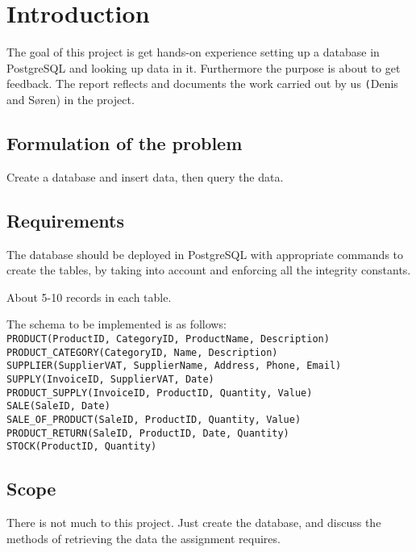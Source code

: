 \section{Introduction}
The goal of this project is get hands-on experience setting up a database in PostgreSQL and
looking up data in it. Furthermore the purpose is about to get feedback. The report
reflects and documents the work carried out by us \texttt(Denis and Søren) in the project.

\subsection{Formulation of the problem}
Create a database and insert data, then query the data.

\subsection{Requirements}
The database should be deployed in PostgreSQL with appropriate commands
to create the tables, by taking into account and enforcing all the integrity constants.

About 5-10 records in each table.


\bigbreak
The schema to be implemented is as follows:\\
\texttt{PRODUCT(ProductID, CategoryID, ProductName, Description)}\\
\texttt{PRODUCT\_CATEGORY(CategoryID, Name, Description)}\\
\texttt{SUPPLIER(SupplierVAT, SupplierName, Address, Phone, Email)}\\
\texttt{SUPPLY(InvoiceID, SupplierVAT, Date)}\\
\texttt{PRODUCT\_SUPPLY(InvoiceID, ProductID, Quantity, Value)}\\
\texttt{SALE(SaleID, Date)}\\
\texttt{SALE\_OF\_PRODUCT(SaleID, ProductID, Quantity, Value)}\\
\texttt{PRODUCT\_RETURN(SaleID, ProductID, Date, Quantity)}\\
\texttt{STOCK(ProductID, Quantity)}\\



\subsection{Scope}
There is not much to this project. Just create the database, and discuss the methods of retrieving the data
the assignment requires.

